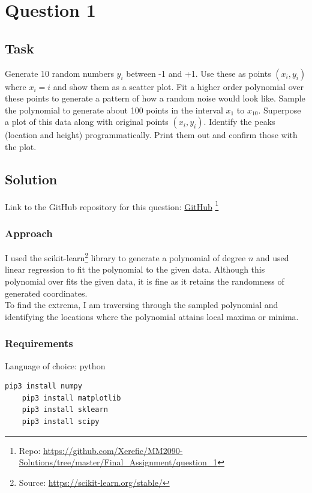 \section{Question 1}

\subsection{Task}
Generate 10 random numbers $y_i$ between -1 and +1. Use these as points $\left(x_i,y_i\right)$ where $x_i=i$ and show them as a scatter plot. Fit a higher order polynomial over these points to generate a pattern of how a random noise would look like. Sample the polynomial to generate about 100 points in the interval $x_1$ to $x_{10}$. Superpose a plot of this data along with original points $\left(x_i,y_i\right)$.  Identify the peaks (location and height) programmatically. Print them out and confirm those with the plot.

\subsection{Solution}

Link to the GitHub repository for this question: \href{https://github.com/Xerefic/MM2090-Solutions/tree/master/Final_Assignment/question_1}{GitHub} \footnote{Repo: \url{https://github.com/Xerefic/MM2090-Solutions/tree/master/Final_Assignment/question_1}}

\subsubsection{Approach}
I used the scikit-learn\footnote{Source: \url{https://scikit-learn.org/stable/}} library to generate a polynomial of degree $n$ and used linear regression to fit the polynomial to the given data. Although this polynomial over fits the given data, it is fine as it retains the randomness of generated coordinates. \\
To find the extrema, I am traversing through the sampled polynomial and identifying the locations where the polynomial attains local maxima or minima. 

\subsubsection{Requirements}
Language of choice: python
\begin{lstlisting}[language=bash]
	pip3 install numpy
	pip3 install matplotlib
	pip3 install sklearn
	pip3 install scipy
\end{lstlisting}

